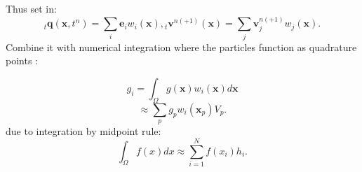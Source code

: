 \documentclass{beamer}
\let\oldcite=\cite
\renewcommand{\cite}[1]{\textcolor[rgb]{.55,.55,.89}{\oldcite{#1}}}
\begin{document}
\begin{frame}
Thus set in:
$$
{}_t\boldsymbol{q}(\boldsymbol{x},t^n) = \sum_i \boldsymbol{e}_iw_i(\boldsymbol{x}),
{}_t\boldsymbol{v}^{n(+1)}(\boldsymbol{x}) = \sum_j \boldsymbol{v}^{n(+1)}_jw_j(\boldsymbol{x}).
$$
Combine it with numerical integration where the particles function as quadrature points \cite{Steffen}:

\begin{minipage}{0.6\textwidth}

$$
g _ { i } = \int _ { \Omega } g ( \boldsymbol{x} ) w _ { i } ( \boldsymbol{x} ) d \boldsymbol{x}
$$
\begin{equation}
  \approx \sum _ { p } g _ { p }  w_i(\boldsymbol{x}_p) V _ { p }.
\end{equation}
due to integration by midpoint rule:
\begin{equation}
\int _ { \Omega } f ( x ) d x \approx \sum _ { i = 1 } ^ { N } f \left( x _ { i } \right) h _ { i }.
\end{equation}

\end{minipage}
\begin{minipage}{0.3\textwidth}
\end{minipage}
\end{frame}
\end{document}
